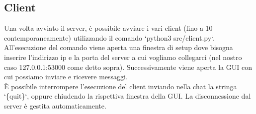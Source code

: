 \documentclass{article}
\begin{document}
\subsection{Client}
Una volta avviato il server, è possibile avviare i vari client (fino a 10 contemporaneamente) utilizzando il comando `python3 src/client.py`. All'esecuzione del comando viene aperta una finestra di setup dove bisogna inserire l'indirizzo ip e la porta del server a cui vogliamo collegarci (nel nostro caso 127.0.0.1:53000 come detto sopra). Successivamente viene aperta la GUI con cui possiamo inviare e ricevere messaggi.\\
È possibile interrompere l'esecuzione del client inviando nella chat la stringa `\{quit\}`, oppure chiudendo la rispettiva finestra della GUI. La disconnessione dal server è gestita automaticamente.\\
\end{document}
